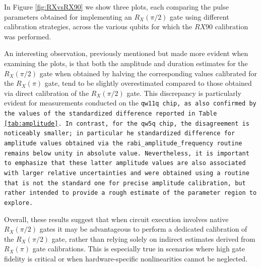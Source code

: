 In Figure \ref{fig:RXvsRX90} we show three plots, each comparing the pulse parameters obtained for implementing an $R_X(\pi/2)$ gate using different calibration strategies, across the various qubits for which the $RX90$ calibration was performed.

An interesting observation, previously mentioned but made more evident when examining the plots, is that both the amplitude and duration estimates for the $R_X(\pi/2)$ gate when obtained by halving the corresponding values calibrated for the $R_X(\pi)$ gate, tend to be slightly overestimated compared to those obtained via direct calibration of the $R_X(\pi/2)$ gate.
This discrepancy is particularly evident for measurements conducted on the \tt{qw11q} chip, as also confirmed by the values of the standardized difference reported in Table \ref{tab:amplitude}.
In contrast, for the \tt{qw5q} chip, the disagreement is noticeably smaller; in particular he standardized difference for amplitude values obtained via the \tt{rabi\_amplitude\_frequency} routine remains below unity in absolute value.
Nevertheless, it is important to emphasize that these latter amplitude values are also associated with larger relative uncertainties and were obtained using a routine that is not the standard one for precise amplitude calibration, but rather intended to provide a rough estimate of the parameter region to explore.

Overall, these results suggest that when circuit execution involves native $R_X(\pi/2)$ gates it may be advantageous to perform a dedicated calibration of the $R_X(\pi/2)$ gate, rather than relying solely on indirect estimates derived from $R_X(\pi)$ gate calibrations. 
This is especially true in scenarios where high gate fidelity is critical or when hardware-specific nonlinearities cannot be neglected.

